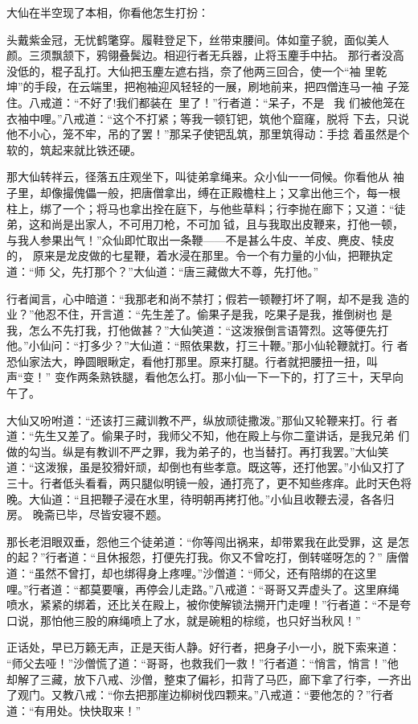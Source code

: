 大仙在半空现了本相，你看他怎生打扮：

头戴紫金冠，无忧鹤氅穿。履鞋登足下，丝带束腰间。体如童子貌，面似美人
颜。三须飘颔下，鸦翎叠鬓边。相迎行者无兵器，止将玉麈手中拈。
那行者没高没低的，棍子乱打。大仙把玉麈左遮右挡，奈了他两三回合，使一个“袖
里乾坤”的手段，在云端里，把袍袖迎风轻轻的一展，刷地前来，把四僧连马一袖
子笼住。八戒道：“不好了!我们都装在里了！”行者道：“呆子，不是，我
们被他笼在衣袖中哩。”八戒道：“这个不打紧；等我一顿钉钯，筑他个窟窿，脱将
下去，只说他不小心，笼不牢，吊的了罢！”那呆子使钯乱筑，那里筑得动：手捻
着虽然是个软的，筑起来就比铁还硬。

那大仙转祥云，径落五庄观坐下，叫徒弟拿绳来。众小仙一一伺候。你看他从
袖子里，却像撮傀儡一般，把唐僧拿出，缚在正殿檐柱上；又拿出他三个，每一根
柱上，绑了一个；将马也拿出拴在庭下，与他些草料；行李抛在廊下；又道：“徒
弟，这和尚是出家人，不可用刀枪，不可加钺，且与我取出皮鞭来，打他一顿，
与我人参果出气！”众仙即忙取出一条鞭——不是甚么牛皮、羊皮、麂皮、犊皮的，
原来是龙皮做的七星鞭，着水浸在那里。令一个有力量的小仙，把鞭执定道：“师
父，先打那个？”大仙道：“唐三藏做大不尊，先打他。”

行者闻言，心中暗道：“我那老和尚不禁打；假若一顿鞭打坏了啊，却不是我
造的业？”他忍不住，开言道：“先生差了。偷果子是我，吃果子是我，推倒树也
是我，怎么不先打我，打他做甚？”大仙笑道：“这泼猴倒言语膂烈。这等便先打
他。”小仙问：“打多少？”大仙道：“照依果数，打三十鞭。”那小仙轮鞭就打。行
者恐仙家法大，睁圆眼瞅定，看他打那里。原来打腿。行者就把腰扭一扭，叫声“变！”
变作两条熟铁腿，看他怎么打。那小仙一下一下的，打了三十，天早向午了。

大仙又吩咐道：“还该打三藏训教不严，纵放顽徒撒泼。”那仙又轮鞭来打。行
者道：“先生又差了。偷果子时，我师父不知，他在殿上与你二童讲话，是我兄弟
们做的勾当。纵是有教训不严之罪，我为弟子的，也当替打。再打我罢。”大仙笑
道：“这泼猴，虽是狡猾奸顽，却倒也有些孝意。既这等，还打他罢。”小仙又打了
三十。行者低头看看，两只腿似明镜一般，通打亮了，更不知些疼痒。此时天色将
晚。大仙道：“且把鞭子浸在水里，待明朝再拷打他。”小仙且收鞭去浸，各各归房。
晚斋已毕，尽皆安寝不题。

那长老泪眼双垂，怨他三个徒弟道：“你等闯出祸来，却带累我在此受罪，这
是怎的起？”行者道：“且休报怨，打便先打我。你又不曾吃打，倒转嗟呀怎的？”
唐僧道：“虽然不曾打，却也绑得身上疼哩。”沙僧道：“师父，还有陪绑的在这里
哩。”行者道：“都莫要嚷，再停会儿走路。”八戒道：“哥哥又弄虚头了。这里麻绳
喷水，紧紧的绑着，还比关在殿上，被你使解锁法搠开门走哩！”行者道：“不是夸
口说，那怕他三股的麻绳喷上了水，就是碗粗的棕缆，也只好当秋风！”

正话处，早已万籁无声，正是天街人静。好行者，把身子小一小，脱下索来道：
“师父去哑！”沙僧慌了道：“哥哥，也救我们一救！”行者道：“悄言，悄言！”他
却解了三藏，放下八戒、沙僧，整束了偏衫，扣背了马匹，廊下拿了行李，一齐出
了观门。又教八戒：“你去把那崖边柳树伐四颗来。”八戒道：“要他怎的？”行者
道：“有用处。快快取来！”

